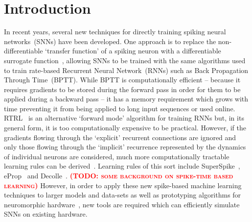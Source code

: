 \documentclass[sigconf,authordraft]{acmart}
\newcommand{\todo}[1]{\textbf{\textsc{\textcolor{red}{(TODO: #1)}}}}
\begin{document}


\maketitle

\section{Introduction}
In recent years, several new techniques for directly training spiking neural networks~(SNNs) have been developed.
One approach is to replace the non-differentiable `transfer function' of a spiking neuron with a differentiable surrogate function~\citep{Bohte2011,Bellec2018,Zenke2021a}, allowing SNNs to be trained with the same algorithms used to train rate-based Recurrent Neural Network~(RNNs) such as Back Propagation Through Time~(BPTT).
While BPTT is computationally efficient -- because it requires gradients to be stored during the forward pass in order for them to be applied during a backward pass -- it has a memory requirement which grows with time preventing it from being applied to long input sequences or used online.
RTRL~\citep{Williams1989} is an alternative `forward mode' algorithm for training RNNs but, in its general form, it is too computationally expensive to be practical.
However, if the gradients flowing through the `explicit' recurrent connections are ignored and only those flowing through the `implicit' recurrence represented by the dynamics of individual neurons are considered, much more computationally tractable learning rules can be derived~\citep{Zenke2021}.
Learning rules of this sort include SuperSpike~\citep{Zenke2018}, eProp~\citep{Bellec2018} and Decolle~\citep{Kaiser2020}.
\todo{some background on spike-time based learning}
However, in order to apply these new spike-based machine learning techniques to larger models and data-sets as well as prototyping algorithms for neuromorphic hardware~\citep{Davies2018,Furber2014,Merolla2014}, new tools are required which can efficiently simulate SNNs on existing hardware. 
\end{document}
